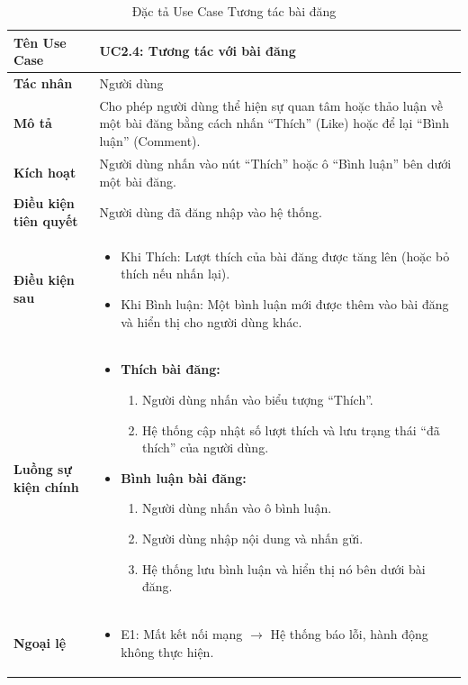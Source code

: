 \begin{table}[H]
\centering
\begin{tabularx}{\textwidth}{|l|X|}
\hline
\textbf{Tên Use Case} & \textbf{UC2.4: Tương tác với bài đăng} \\ \hline
\textbf{Tác nhân} & Người dùng \\ \hline
\textbf{Mô tả} & Cho phép người dùng thể hiện sự quan tâm hoặc thảo luận về một bài đăng bằng cách nhấn ``Thích'' (Like) hoặc để lại ``Bình luận'' (Comment). \\ \hline
\textbf{Kích hoạt} & Người dùng nhấn vào nút ``Thích'' hoặc ô ``Bình luận'' bên dưới một bài đăng. \\ \hline
\textbf{Điều kiện tiên quyết} & Người dùng đã đăng nhập vào hệ thống. \\ \hline
\textbf{Điều kiện sau} & 
\begin{itemize}
    \item Khi Thích: Lượt thích của bài đăng được tăng lên (hoặc bỏ thích nếu nhấn lại).
    \item Khi Bình luận: Một bình luận mới được thêm vào bài đăng và hiển thị cho người dùng khác.
\end{itemize} \\ \hline
\textbf{Luồng sự kiện chính} & 
\begin{itemize}
    \item \textbf{Thích bài đăng:}
    \begin{enumerate}
        \item Người dùng nhấn vào biểu tượng ``Thích''.
        \item Hệ thống cập nhật số lượt thích và lưu trạng thái ``đã thích'' của người dùng.
    \end{enumerate}
    \item \textbf{Bình luận bài đăng:}
    \begin{enumerate}
        \item Người dùng nhấn vào ô bình luận.
        \item Người dùng nhập nội dung và nhấn gửi.
        \item Hệ thống lưu bình luận và hiển thị nó bên dưới bài đăng.
    \end{enumerate}
\end{itemize} \\ \hline
\textbf{Ngoại lệ} & 
\begin{itemize}
    \item E1: Mất kết nối mạng $\rightarrow$ Hệ thống báo lỗi, hành động không thực hiện.
\end{itemize} \\ \hline
\end{tabularx}
\caption{Đặc tả Use Case Tương tác bài đăng}
\end{table}

